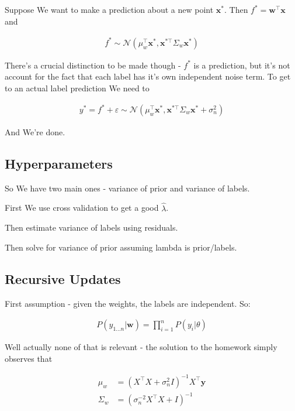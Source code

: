 \documentclass{article}
\begin{document}
		Suppose We want to make a prediction about a new point $\mathbf{x}^*$. Then $f^* = \mathbf{w^\top x}$ and
		
		\begin{align}
			f^* \sim \mathcal{N}(\mu_w^\top\mathbf{x}^*, \mathbf{x}^{*\top}\Sigma_w\mathbf{x}^*)
		\end{align}
		
		There's a crucial distinction to be made though - $f^*$ is a prediction, but it's not account for the fact that each label has it's own independent noise term. To get to an actual label prediction We need to
		
		\begin{align}
			y^* = f^* + \varepsilon \sim \mathcal{N}(\mu_w^\top\mathbf{x}^*, \mathbf{x}^{*\top}\Sigma_w\mathbf{x}^* + \sigma^2_n)
		\end{align}
		
		And We're done.
		
	\subsection{Hyperparameters}
	
		So We have two main ones - variance of prior and variance of labels.
		
		First We use cross validation to  get a good $\hat{\lambda}$.
		
		Then estimate variance of labels using residuals.
		
		Then solve for variance of prior assuming lambda is prior/labels. 
	
	\subsection{Recursive Updates}
	
		First assumption - given the weights, the labels are independent. So:
		
		\begin{align}
			P(y_{1\ldots n} | \mathbf{w}) = \prod^n_{i=1} P(y_i|\theta)
		\end{align}
		
		Well actually none of that is relevant - the solution to the homework simply observes that 
		
		\begin{align}
			\mu_w &= (X^\top X + \sigma_n^2I)^{-1}X^\top \mathbf{y}\\
			\Sigma_w &= (\sigma_n^{-2}X^\top X + I)^{-1}			
		\end{align}
		
\end{document}
